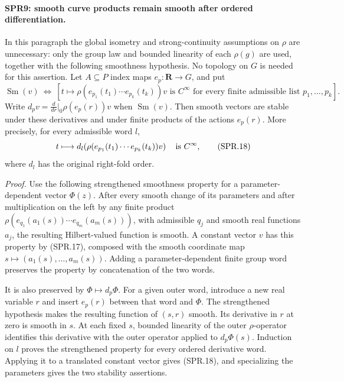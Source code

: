 \paragraph{SPR9: smooth curve products remain smooth after ordered differentiation.}
\label{claim:SPR9}
In this paragraph the global isometry and strong-continuity
assumptions on \(\rho\) are unnecessary: only the group law and
bounded linearity of each \(\rho(g)\) are used, together with
the following smoothness hypothesis.  No topology on \(G\)
is needed for this assertion.
Let \(A\subseteq P\) index maps \(e_p:\mathbf R\to G\), and put
\[
 \operatorname{Sm}(v)\ \Longleftrightarrow\
  \left[t\longmapsto
   \rho(e_{p_1}(t_1)\cdots e_{p_k}(t_k))v
     \text{ is }C^\infty
       \text{ for every finite admissible list }p_1,\ldots,p_k\right].
 \tag{SPR.17}
\]
Write \(d_pv=\frac{d}{dr}|_0\rho(e_p(r))v\) when
\(\operatorname{Sm}(v)\).
Then smooth vectors are stable under these derivatives and under
finite products of the actions \(e_p(r)\).  More precisely, for
every admissible word \(l\),
\[
 t\longmapsto d_l\!
       \left(\rho(e_{p_1}(t_1)\cdots e_{p_k}(t_k))v\right)
           \quad\hbox{is }C^\infty,
 \tag{SPR.18}
\]
where \(d_l\) has the original right-fold order.

\emph{Proof.}
Use the following strengthened smoothness property for a
parameter-dependent vector \(\Phi(z)\).
After every smooth change of its parameters and after multiplication
on the left by any finite product
\(\rho(e_{q_1}(a_1(s))\cdots e_{q_m}(a_m(s)))\), with admissible
\(q_j\) and smooth real functions \(a_j\), the resulting
Hilbert-valued function is smooth.
A constant vector \(v\) has this property by (SPR.17), composed
with the smooth coordinate map
\(s\mapsto(a_1(s),\ldots,a_m(s))\).
Adding a parameter-dependent finite group word preserves the
property by concatenation of the two words.

It is also preserved by \(\Phi\mapsto d_p\Phi\).
For a given outer word, introduce a new real variable \(r\) and
insert \(e_p(r)\) between that word and \(\Phi\).
The strengthened hypothesis makes the resulting function of
\((s,r)\) smooth.  Its derivative in \(r\) at zero is smooth in
\(s\).  At each fixed \(s\), bounded linearity of the outer
\(\rho\)-operator identifies this derivative with the outer
operator applied to \(d_p\Phi(s)\).
Induction on \(l\) proves the strengthened property for every
ordered derivative word.  Applying it to a translated constant
vector gives (SPR.18), and specializing the parameters gives the
two stability assertions.

